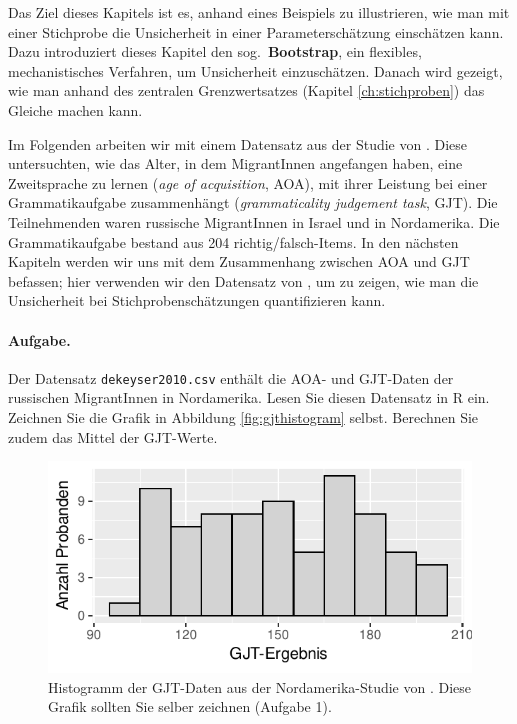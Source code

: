 \documentclass[oneside, 10pt]{book}\usepackage[]{graphicx}\usepackage[]{xcolor}
\newenvironment{knitrout}{}{} %
\begin{document}
Das Ziel dieses Kapitels ist es, anhand eines Beispiels zu
illustrieren, wie man mit einer Stichprobe die Unsicherheit
in einer Parameterschätzung einschätzen kann.
Dazu introduziert dieses Kapitel den sog.\ \textbf{Bootstrap},
ein flexibles, mechanistisches Verfahren,
um Unsicherheit einzuschätzen.
Danach wird gezeigt, wie man anhand des zentralen Grenzwertsatzes
(Kapitel \ref{ch:stichproben}) das Gleiche machen kann.

Im Folgenden arbeiten wir mit einem Datensatz
aus der Studie von \citet{DeKeyser2010}.
Diese untersuchten, wie das Alter,
in dem MigrantInnen angefangen haben, eine Zweitsprache
zu lernen (\textit{age of acquisition}, AOA),
mit ihrer Leistung bei einer Grammatikaufgabe
zusammenhängt (\textit{grammaticality judgement task}, GJT).
Die Teilnehmenden waren russische MigrantInnen in Israel
und in Nordamerika.
Die Grammatikaufgabe bestand aus 204 richtig/falsch-Items.
In den nächsten Kapiteln werden wir uns mit dem
Zusammenhang zwischen AOA und GJT befassen;
hier verwenden wir den Datensatz von \citet{DeKeyser2010},
um zu zeigen, wie man die Unsicherheit bei Stichprobenschätzungen
quantifizieren kann.



\paragraph{Aufgabe.}
Der Datensatz \texttt{dekeyser2010.csv} enthält
die AOA- und GJT-Daten der russischen MigrantInnen
in Nordamerika.
Lesen Sie diesen Datensatz in R ein.
Zeichnen Sie die Grafik in Abbildung \ref{fig:gjthistogram} selbst.
Berechnen Sie zudem das Mittel der GJT-Werte.

\begin{knitrout}
\color{fgcolor}\begin{figure}[tp]

{\centering \includegraphics[width=.4\textwidth]{figs/unnamed-chunk-140-1} 

}

\caption{Histogramm der GJT-Daten aus der Nordamerika-Studie von \citet{DeKeyser2010}. Diese Grafik sollten Sie selber zeichnen (Aufgabe 1).\label{fig:gjthistogram}}\label{fig:unnamed-chunk-140}
\end{figure}

\end{knitrout}
\end{document}
